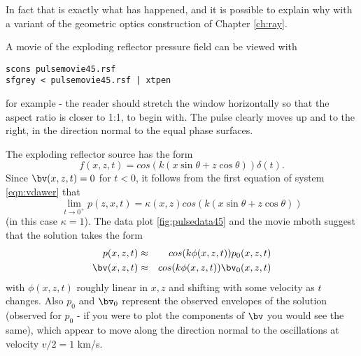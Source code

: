 In fact that is exactly what has happened, and it is possible to explain why with a variant of the geometric optics construction of Chapter \ref{ch:ray}.

A movie of the exploding reflector pressure field can be viewed with
\begin{verbatim}
scons pulsemovie45.rsf
sfgrey < pulsemovie45.rsf | xtpen
\end{verbatim}
for example - the reader should stretch the window horizontally so that the aspect ratio is closer to 1:1, to begin with. The pulse clearly moves up and to the right, in the direction normal to the equal phase surfaces.

The exploding reflector source has the form
\begin{equation}
\label{eqn:explrefrhs}
f(x,z,t) = cos(k(x \sin \theta + z \cos \theta))\delta(t).
\end{equation}
Since $\bv(x,z,t) = 0$ for $t<0$, it follows from the first equation of system \ref{eqn:vdawer} that
\begin{equation}
\label{eqn:explrefinit}
\lim_{t \rightarrow 0^+} p(z,x,t) = \kappa(x,z)cos(k(x \sin \theta + z \cos \theta))
\end{equation}
(in this case $\kappa = 1$). The data plot \ref{fig:pulsedata45} and the movie mboth suggest that the solution takes the form
\begin{eqnarray}
\label{eqn:go}
p(x,z,t) & \approx & cos(k \phi(x,z,t))p_0(x,z,t)\nonumber \\
\bv(x,z,t) & \approx & cos(k \phi(x,z,t))\bv_0(x,z,t) 
\end{eqnarray}
with $\phi(x,z,t)$ roughly linear in $x,z$ and shifting with some velocity as $t$ changes. Also $p_0$ and $\bv_0$ represent the observed envelopes of the solution (observed for $p_0$ - if you were to plot the components of $\bv$ you would see the same), which appear to move along the direction normal to the oscillations at velocity $v/2 =1$ km/s.

